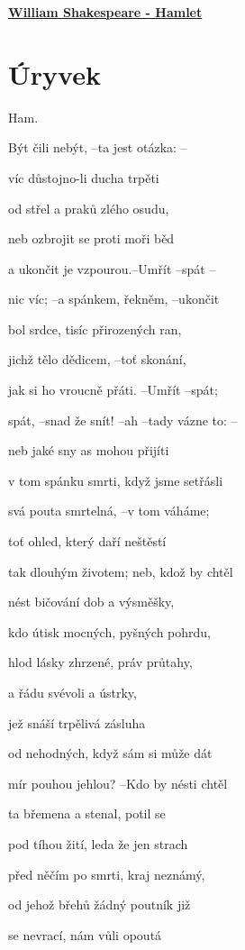 \documentclass[11pt]{article}
\begin{document}
    \begin{center}
        \underline{\textbf{\Huge William Shakespeare - Hamlet}}
    \end{center}
    \section*{Úryvek}
    \begin{multicols}{2}
    Ham. 

    Být čili nebýt, –ta jest otázka: –

    víc důstojno-li ducha trpěti

    od střel a praků zlého osudu,

    neb ozbrojit se proti moři běd

    a ukončit je vzpourou.–Umřít –spát –

    nic víc; –a spánkem, řekněm, –ukončit

    bol srdce, tisíc přirozených ran,

    jichž tělo dědicem, –toť skonání,

    jak si ho vroucně přáti. –Umřít –spát;

    spát, –snad že snít! –ah –tady vázne to: –

    neb jaké sny as mohou přijíti

    v tom spánku smrti, když jsme setřásli

    svá pouta smrtelná, –v tom váháme;

    toť ohled, který daří neštěstí

    tak dlouhým životem; neb, kdož by chtěl

    nést bičování dob a výsměšky,

    kdo útisk mocných, pyšných pohrdu,

    hlod lásky zhrzené, práv průtahy,

    a řádu svévoli a ústrky,

    jež snáší trpělivá zásluha

    od nehodných, když sám si může dát

    mír pouhou jehlou? –Kdo by nésti chtěl

    ta břemena a stenal, potil se

    pod tíhou žití, leda že jen strach

    před něčím po smrti, kraj neznámý,

    od jehož břehů žádný poutník již

    se nevrací, nám vůli opoutá


\end{multicols}
\end{document}
